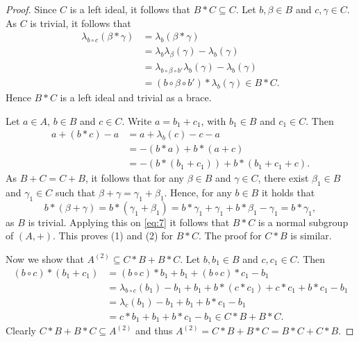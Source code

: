 \begin{proof}
Since $C$ is a left ideal, it follows that $B*C \subseteq C$. 
Let $b,\beta \in B$ and $c, \gamma \in C$. As $C$ is trivial, it follows that 
\begin{align*}
    \lambda_{b \circ c} (\beta * \gamma) & =\lambda_b(\beta * \gamma)\\
                                         & =\lambda_b \lambda_{\beta} (\gamma) - \lambda_b(\gamma)\\
                                         & =\lambda_{b \circ \beta \circ b'}\lambda_b(\gamma) -\lambda_b(\gamma)\\
                                         & =(b \circ \beta \circ b') * \lambda_b(\gamma) \in B*C. 
\end{align*}
Hence $B*C$ is a left ideal and trivial as a brace. 

Let $a \in A$, $b \in B$ and $c \in C$. Write $a=b_1 + c_1$, with $b_1 \in B$ and $c_1 \in C$. Then
\begin{equation}\label{eq:7}
    \begin{aligned}
        a+(b*c)-a & =a + \lambda_b(c) - c - a\\
                  & =-(b*a) + b*(a+c)\\
                  & =-(b*(b_1+c_1)) + b* (b_1 + c_1+c).
    \end{aligned}
\end{equation}
As $B+C=C+B$, it follows that for any $\beta \in B$ and $\gamma \in C$, there exist $\beta_1\in B$ and $\gamma_1\in C$ such that
$\beta + \gamma = \gamma_1 + \beta_1$. Hence, for any $b \in B$ it holds that
\[
b*(\beta + \gamma)=b*(\gamma_1 + \beta_1)= b*\gamma_1 + \gamma_1 + b*\beta_1 - \gamma_1=b*\gamma_1 ,
\]
as $B$ is trivial. Applying this on \eqref{eq:7} it follows that $B*C$ is a normal subgroup of $(A,+)$.
This proves (1) and (2) for $B*C$. The proof for $C*B$ is similar.

Now we show that $A^{(2)} \subseteq C*B + B*C$. Let $b,b_1 \in B$ and $c,c_1 \in C$. Then
\begin{align*}
    (b\circ c)*(b_1+c_1) & =(b\circ c)*b_1 + b_1 + (b \circ c)*c_1 -b_1\\
                         & =\lambda_{b\circ c}(b_1) - b_1 + b_1 + b*(c*c_1) + c*c_1 + b*c_1 -b_1\\
                         & =\lambda_c(b_1) - b_1 +b_1 +b*c_1-b_1\\
                         & =c*b_1 + b_1 + b*c_1 -b_1 \in C*B+B*C.
\end{align*}
Clearly $C*B + B*C \subseteq A^{(2)}$ and thus $A^{(2)} = C*B+B*C=B*C + C*B$. 
\end{proof}


